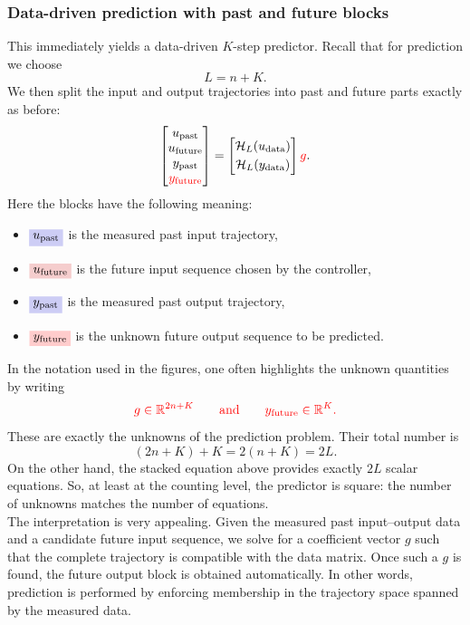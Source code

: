 \subsubsection{Data-driven prediction with past and future blocks}
This immediately yields a data-driven $K$-step predictor. Recall that for prediction we choose
\[
L=n+K.
\]
We then split the input and output trajectories into past and future parts exactly as before:
\[
\begin{bmatrix}
u_{\mathrm{past}}\\
u_{\mathrm{future}}\\
y_{\mathrm{past}}\\
\textcolor{red}{y_{\mathrm{future}}}
\end{bmatrix}
=
\begin{bmatrix}
\mathcal{H}_L(u_{\mathrm{data}})\\[1mm]
\mathcal{H}_L(y_{\mathrm{data}})
\end{bmatrix}\textcolor{red}{g}.
\]
Here the blocks have the following meaning:
\begin{itemize}
    \item \(\colorbox{lightblue}{$\displaystyle u_{\mathrm{past}}$}\) is the measured past input trajectory,
    \item \(\colorbox{lightred}{$\displaystyle u_{\mathrm{future}}$}\) is the future input sequence chosen by the controller,
    \item \(\colorbox{lightblue}{$\displaystyle y_{\mathrm{past}}$}\) is the measured past output trajectory,
    \item \(\colorbox{red!20}{$\displaystyle y_{\mathrm{future}}$}\) is the unknown future output sequence to be predicted.
\end{itemize}
In the notation used in the figures, one often highlights the unknown quantities by writing
\[
\color{red}{g\in\mathbb{R}^{2n+K}}
\qquad\text{and}\qquad
\color{red}{y_{\mathrm{future}}\in\mathbb{R}^{K}}.
\]
These are exactly the unknowns of the prediction problem. Their total number is
\[
(2n+K)+K=2(n+K)=2L.
\]
On the other hand, the stacked equation above provides exactly \(2L\) scalar equations. So, at least at the counting level, the predictor is square: the number of unknowns matches the number of equations.\\
The interpretation is very appealing. Given the measured past input--output data and a candidate future input sequence, we solve for a coefficient vector \(g\) such that the complete trajectory is compatible with the data matrix. Once such a \(g\) is found, the future output block is obtained automatically. In other words, prediction is performed by enforcing membership in the trajectory space spanned by the measured data.\\
